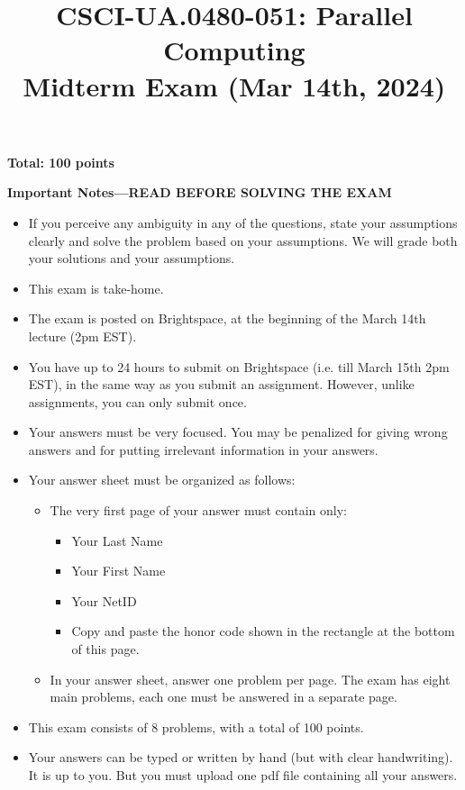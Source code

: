\documentclass{article}
\begin{document}
\title{CSCI-UA.0480-051: Parallel Computing \\ Midterm Exam (Mar 14th, 2024)}
\author{}
\date{}
\maketitle

\textbf{Total: 100 points}

\textbf{Important Notes---READ BEFORE SOLVING THE EXAM}
\begin{itemize}
    \item If you perceive any ambiguity in any of the questions, state your assumptions clearly and solve the problem based on your assumptions. We will grade both your solutions and your assumptions.
    \item This exam is take-home.
    \item The exam is posted on Brightspace, at the beginning of the March 14th lecture (2pm EST).
    \item You have up to 24 hours to submit on Brightspace (i.e. till March 15th 2pm EST), in the same way as you submit an assignment. However, unlike assignments, you can only submit once.
    \item Your answers must be very focused. You may be penalized for giving wrong answers and for putting irrelevant information in your answers.
    \item Your answer sheet must be organized as follows:
    \begin{itemize}
        \item The very first page of your answer must contain only:
        \begin{itemize}
            \item Your Last Name
            \item Your First Name
            \item Your NetID
            \item Copy and paste the honor code shown in the rectangle at the bottom of this page.
        \end{itemize}
        \item In your answer sheet, answer one problem per page. The exam has eight main problems, each one must be answered in a separate page.
    \end{itemize}
    \item This exam consists of 8 problems, with a total of 100 points.
    \item Your answers can be typed or written by hand (but with clear handwriting). It is up to you. But you must upload one pdf file containing all your answers.
\end{itemize}
\end{document}
